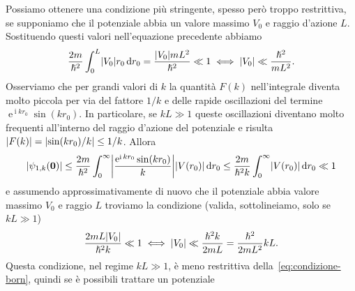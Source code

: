\documentclass[a4paper,fleqn,twoside,12pt]{article}
\newcommand*{\dd}{\mathop{}\!\mathrm{d}} %
\DeclareMathOperator{\e}{\mathrm{e}} %
\DeclareMathOperator{\uimm}{\mathrm{i}} %
\DeclarePairedDelimiter{\abs}{\lvert}{\rvert}
\begin{document}
Possiamo ottenere una condizione più stringente, spesso però troppo restrittiva,
se supponiamo che il potenziale abbia un valore massimo $V_{0}$ e raggio
d'azione $L$.  Sostituendo questi valori nell'equazione precedente abbiamo
\begin{equation}
  \label{eq:condizione-born}
  \frac{2m}{\hslash^{2}}\int_{0}^{L}\abs{V_{0}}r_{0}\dd r_{0} =
  \frac{\abs{V_{0}}mL^{2}}{\hslash^{2}} \ll 1 \iff \abs{V_{0}} \ll
  \frac{\hslash^{2}}{mL^{2}}.
\end{equation}
Osserviamo che per grandi valori di $k$ la quantità $F(k)$ nell'integrale
diventa molto piccola per via del fattore $1/k$ e delle rapide oscillazioni del
termine $\e^{\uimm kr_{0}}\sin(kr_{0})$.  In particolare, se $kL \gg 1$ queste
oscillazioni diventano molto frequenti all'interno del raggio d'azione del
potenziale e risulta $\abs{F(k)} = \abs{\sin(kr_{0})/k} \leq 1/k$.  Allora
\begin{equation}
  \abs{\psi_{1,k}(\bm{0})} \leq \frac{2m}{\hslash^{2}} \int_{0}^{\infty}
  \abs*{\frac{\e^{\uimm kr_{0}}\sin(kr_{0})}{k}} \abs{V(r_{0})} \dd r_{0} \leq
  \frac{2m}{\hslash^{2}k} \int_{0}^{\infty} \abs{V(r_{0})} \dd r_{0} \ll 1
\end{equation}
e assumendo approssimativamente di nuovo che il potenziale abbia valore massimo
$V_{0}$ e raggio $L$ troviamo la condizione (valida, sottolineiamo, solo se
$kL \gg 1$)
\begin{equation}
  \frac{2mL\abs{V_{0}}}{\hslash^{2}k} \ll 1 \iff \abs{V_{0}} \ll
  \frac{\hslash^{2}k}{2mL} = \frac{\hslash^{2}}{2mL^{2}} kL. %
\end{equation}
Questa condizione, nel regime $kL \gg 1$, è meno restrittiva
della~\eqref{eq:condizione-born}, quindi se è possibili trattare un potenziale
\end{document}
